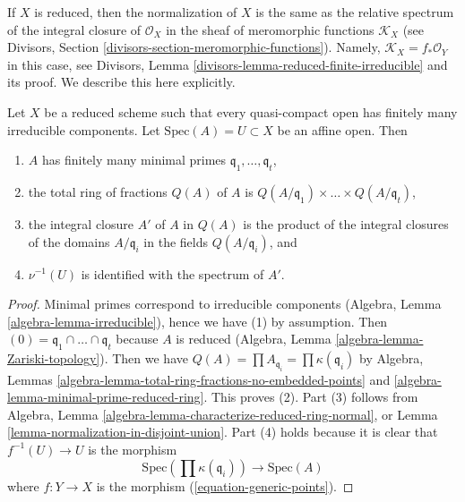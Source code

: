 \noindent
If $X$ is reduced, then the normalization of $X$ is the same
as the relative spectrum of the integral closure of $\mathcal{O}_X$
in the sheaf of meromorphic functions $\mathcal{K}_X$
(see Divisors, Section \ref{divisors-section-meromorphic-functions}).
Namely, $\mathcal{K}_X = f_*\mathcal{O}_Y$ in this case, see
Divisors, Lemma \ref{divisors-lemma-reduced-finite-irreducible}
and its proof. We describe this here explicitly.

\begin{lemma}
\label{lemma-description-normalization}
Let $X$ be a reduced scheme such that every quasi-compact open has
finitely many irreducible components. Let $\text{Spec}(A) = U \subset X$
be an affine open. Then
\begin{enumerate}
\item $A$ has finitely many minimal primes
$\mathfrak q_1, \ldots, \mathfrak q_t$,
\item the total ring of fractions $Q(A)$ of $A$ is
$Q(A/\mathfrak q_1) \times \ldots \times Q(A/\mathfrak q_t)$,
\item the integral closure $A'$ of $A$ in $Q(A)$ is the product of
the integral closures of the domains $A/\mathfrak q_i$
in the fields $Q(A/\mathfrak q_i)$, and
\item $\nu^{-1}(U)$ is identified with the spectrum of $A'$.
\end{enumerate}
\end{lemma}

\begin{proof}
Minimal primes correspond to irreducible components
(Algebra, Lemma \ref{algebra-lemma-irreducible}),
hence we have (1) by assumption. Then
$(0) = \mathfrak q_1 \cap \ldots \cap \mathfrak q_t$ because $A$ is reduced
(Algebra, Lemma \ref{algebra-lemma-Zariski-topology}).
Then we have
$Q(A) = \prod A_{\mathfrak q_i} = \prod \kappa(\mathfrak q_i)$
by Algebra, Lemmas \ref{algebra-lemma-total-ring-fractions-no-embedded-points}
and \ref{algebra-lemma-minimal-prime-reduced-ring}.
This proves (2). Part (3) follows from
Algebra, Lemma \ref{algebra-lemma-characterize-reduced-ring-normal},
or Lemma \ref{lemma-normalization-in-disjoint-union}.
Part (4) holds because it is clear that $f^{-1}(U) \to U$ is the morphism
$$
\text{Spec}\left(\prod \kappa(\mathfrak q_i)\right)
\longrightarrow
\text{Spec}(A)
$$
where $f : Y \to X$ is the morphism (\ref{equation-generic-points}).
\end{proof}

